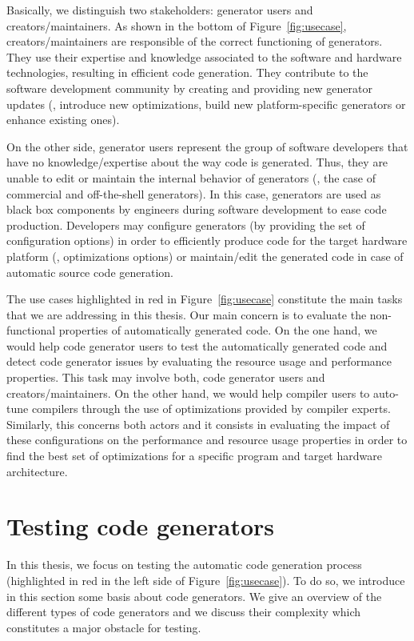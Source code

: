 Basically, we distinguish two stakeholders: generator users and creators/maintainers. As shown in the bottom of Figure~\ref{fig:usecase}, creators/maintainers are responsible of the correct functioning of generators. They use their expertise and knowledge associated to the software and hardware technologies, resulting in efficient code generation. They contribute to the software development community by creating and providing new generator updates (\eg, introduce new optimizations, build new platform-specific generators or enhance existing ones).

On the other side, generator users represent the group of software developers that have no knowledge/expertise about the way code is generated. Thus, they are unable to edit or maintain the internal behavior of generators (\eg, the case of commercial and off-the-shell generators). In this case, generators are used as black box components by engineers during software development to ease code production. Developers may configure generators (by providing the set of configuration options) in order to efficiently produce code for the target hardware platform (\eg, optimizations options) or maintain/edit the generated code in case of automatic source code generation.

The use cases highlighted in red in Figure~\ref{fig:usecase} constitute the main tasks that we are addressing in this thesis. Our main concern is to evaluate the non-functional properties of automatically generated code. On the one hand, we would help code generator users to test the automatically generated code and detect code generator issues by evaluating the resource usage and performance properties. This task may involve both, code generator users and creators/maintainers.
On the other hand, we would help compiler users to auto-tune compilers through the use of optimizations provided by compiler experts. Similarly, this concerns both actors and it consists in evaluating the impact of these configurations on the performance and resource usage properties in order to find the best set of optimizations for a specific program and target hardware architecture.


\section{Testing code generators}
\label{bg:Testing code generators}
In this thesis, we focus on testing the automatic code generation process (highlighted in red in the left side of Figure~\ref{fig:usecase}). To do so, we introduce in this section some basis about code generators. We give an overview of the different types of code generators and we discuss their complexity which constitutes a major obstacle for testing.
